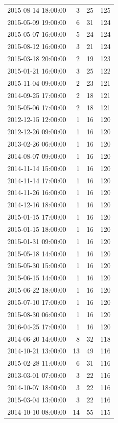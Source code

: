 \begin{tabular}{lrrr}
2015-08-14 18:00:00 & 3 & 25 & 125 \\
2015-05-09 19:00:00 & 6 & 31 & 124 \\
2015-05-07 16:00:00 & 5 & 24 & 124 \\
2015-08-12 16:00:00 & 3 & 21 & 124 \\
2015-03-18 20:00:00 & 2 & 19 & 123 \\
2015-01-21 16:00:00 & 3 & 25 & 122 \\
2015-11-04 09:00:00 & 2 & 23 & 121 \\
2014-09-25 17:00:00 & 2 & 18 & 121 \\
2015-05-06 17:00:00 & 2 & 18 & 121 \\
2012-12-15 12:00:00 & 1 & 16 & 120 \\
2012-12-26 09:00:00 & 1 & 16 & 120 \\
2013-02-26 06:00:00 & 1 & 16 & 120 \\
2014-08-07 09:00:00 & 1 & 16 & 120 \\
2014-11-14 15:00:00 & 1 & 16 & 120 \\
2014-11-14 17:00:00 & 1 & 16 & 120 \\
2014-11-26 16:00:00 & 1 & 16 & 120 \\
2014-12-16 18:00:00 & 1 & 16 & 120 \\
2015-01-15 17:00:00 & 1 & 16 & 120 \\
2015-01-15 18:00:00 & 1 & 16 & 120 \\
2015-01-31 09:00:00 & 1 & 16 & 120 \\
2015-05-18 14:00:00 & 1 & 16 & 120 \\
2015-05-30 15:00:00 & 1 & 16 & 120 \\
2015-06-15 14:00:00 & 1 & 16 & 120 \\
2015-06-22 18:00:00 & 1 & 16 & 120 \\
2015-07-10 17:00:00 & 1 & 16 & 120 \\
2015-08-30 06:00:00 & 1 & 16 & 120 \\
2016-04-25 17:00:00 & 1 & 16 & 120 \\
2014-06-20 14:00:00 & 8 & 32 & 118 \\
2014-10-21 13:00:00 & 13 & 49 & 116 \\
2015-02-28 11:00:00 & 6 & 31 & 116 \\
2013-03-01 07:00:00 & 3 & 22 & 116 \\
2014-10-07 18:00:00 & 3 & 22 & 116 \\
2015-03-04 13:00:00 & 3 & 22 & 116 \\
2014-10-10 08:00:00 & 14 & 55 & 115 \\

\end{tabular}
